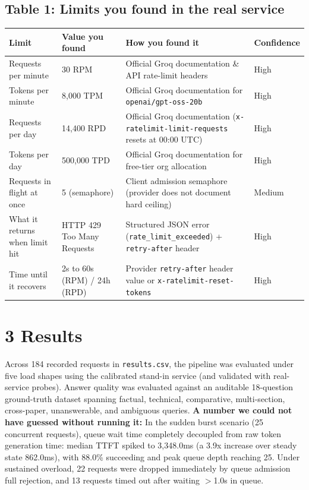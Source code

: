 \documentclass[9pt]{article}
\begin{document}
\subsection*{Table 1: Limits you found in the real service}
\vspace{-2pt}
\begin{table}[h!]
\centering
\fontsize{6.2}{7.4}\selectfont
\begin{tabularx}{\linewidth}{p{3.2cm} p{1.8cm} X p{1.8cm}}
\toprule
\textbf{Limit} & \textbf{Value you found} & \textbf{How you found it} & \textbf{Confidence} \\
\midrule
Requests per minute & 30 RPM & Official Groq documentation \& API rate-limit headers & High \\
Tokens per minute & 8,000 TPM & Official Groq documentation for \texttt{openai/gpt-oss-20b} & High \\
Requests per day & 14,400 RPD & Official Groq documentation (\texttt{x-ratelimit-limit-requests} resets at 00:00 UTC) & High \\
Tokens per day & 500,000 TPD & Official Groq documentation for free-tier org allocation & High \\
Requests in flight at once & 5 (semaphore) & Client admission semaphore (provider does not document hard ceiling) & Medium \\
What it returns when limit hit & HTTP 429 Too Many Requests & Structured JSON error (\texttt{rate\_limit\_exceeded}) + \texttt{retry-after} header & High \\
Time until it recovers & 2s to 60s (RPM) / 24h (RPD) & Provider \texttt{retry-after} header value or \texttt{x-ratelimit-reset-tokens} & High \\
\bottomrule
\end{tabularx}
\end{table}
\vspace{-6pt}

\section{3 \quad Results}
Across 184 recorded requests in \texttt{results.csv}, the pipeline was evaluated under five load shapes using the calibrated stand-in service (and validated with real-service probes). Answer quality was evaluated against an auditable 18-question ground-truth dataset spanning factual, technical, comparative, multi-section, cross-paper, unanswerable, and ambiguous queries.
\textbf{A number we could not have guessed without running it:} In the sudden burst scenario (25 concurrent requests), queue wait time completely decoupled from raw token generation time: median TTFT spiked to 3,348.0ms (a 3.9x increase over steady state 862.0ms), with 88.0\% succeeding and peak queue depth reaching 25. Under sustained overload, 22 requests were dropped immediately by queue admission full rejection, and 13 requests timed out after waiting $>$1.0s in queue.
\end{document}
